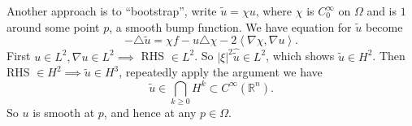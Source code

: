 \documentclass[UTF8,12pt]{article}
\numberwithin{theorem}{section}
\numberwithin{equation}{section}
\begin{document}
\hfill

Another approach is to ``bootstrap'', write \(\tilde{u}=\chi u\), where \(\chi\)
is \(C_0^\infty\) on \(\Omega\) and is \(1\) around some point \(p\), a smooth
bump function.
We have equation for \(\tilde{u}\) become \[
    -\triangle \tilde{u}=\chi f-u\triangle\chi-2\left<\nabla\chi,\nabla u\right> 
.\] First \(u\in L^2, \nabla u\in L^2\implies \) RHS \(\in L^2\).
So \(|\xi|^2\hat{\tilde{u}}\in L^2\), which shows \(\tilde{u}\in H^2\). Then
RHS \(\in H^2\implies \tilde{u}\in H^3\), repeatedly apply the argument we have \[
    \tilde{u}\in \bigcap_{k\ge 0}H^k\subset C^{\infty}(\mathbb{R}^n)
.\] So \(u\) is smooth at \(p\), and hence at any \(p\in \Omega\).

\newpage
\printbibliography{}
\end{document}
